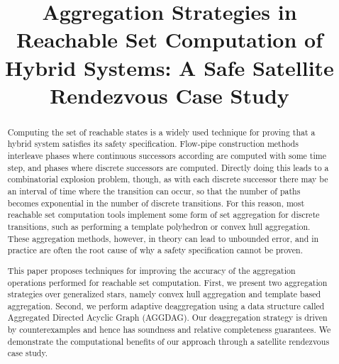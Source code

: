 \documentclass[sigconf]{acmart}
\begin{document}
%
\title{Aggregation Strategies in Reachable Set Computation of Hybrid Systems: A Safe Satellite Rendezvous Case Study}

%
%
%
%

%
\begin{abstract}
  Computing the set of reachable states is a widely used technique for proving that a hybrid system satisfies its safety specification.
  Flow-pipe construction methods interleave phases where continuous successors according are computed with some time step, and
  phases where discrete successors are computed.
  Directly doing this leads to a combinatorial explosion problem, though, as with each discrete successor there may be an interval of time
  where the transition can occur, so that the number of paths becomes exponential in the number of discrete transitions.
  For this reason, most reachable set computation tools implement some form of set aggregation for discrete transitions, such as performing a
  template polyhedron or convex hull aggregation.
  These aggregation methods, however, in theory can lead to unbounded error, and in practice are often
  the root cause of why a safety specification cannot be proven.

  This paper proposes techniques for improving the accuracy of the aggregation operations performed for reachable set computation.
  First, we present two aggregation strategies over generalized stars, namely convex hull aggregation and template based aggregation.
  Second, we perform adaptive deaggregation using a data structure called Aggregated Directed Acyclic Graph (AGGDAG).
  Our deaggregation strategy is driven by counterexamples and hence has soundness and relative completeness guarantees.
  We demonstrate the computational benefits of our approach through a satellite rendezvous case study.
\end{abstract}
\end{document}
